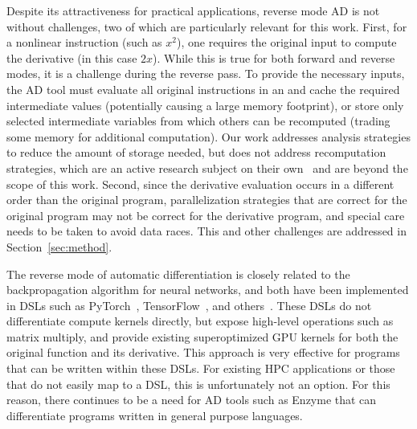 {Despite its attractiveness for practical applications, reverse mode AD is not without challenges, two of which are particularly relevant for this work. First, for a nonlinear instruction (such as $x^2$), one requires the original input to compute the derivative (in this case $2x$). While this is true for both forward and reverse modes, it is a challenge during the reverse pass. To provide the necessary inputs, the AD tool must evaluate all original instructions in an  and cache the required intermediate values (potentially causing a large memory footprint), or store only selected intermediate variables from which others can be recomputed (trading some memory for additional computation). Our work addresses  analysis strategies to reduce the amount of storage needed, but does not address recomputation strategies, which are an active research subject on their own~\cite{griewank2000algorithm,wang2009minimal,aupy2016optimal} and are beyond the scope of this work.
Second, since the derivative evaluation occurs in a different order than the original program, parallelization strategies that are correct for the original program may not be correct for the derivative program, and special care needs to be taken to avoid data races. This and other challenges are addressed in Section~\ref{sec:method}.

The reverse mode of automatic differentiation is closely related to the backpropagation algorithm for neural networks, and both have been implemented in DSLs
such as PyTorch~\cite{paszke2017automatic}, TensorFlow~\cite{abadi2016tensorflow}, and others~\cite{hu2020difftaichi,schoenholz2020jax,kochkov2021machine,de2018end}. These DSLs do not differentiate compute kernels directly, but expose high-level operations such as matrix multiply, and provide existing superoptimized GPU kernels for both the original function and its derivative. This approach is very effective for programs that can be written within these DSLs. For existing HPC applications or those that do not easily map to a DSL, this is unfortunately not an option. For this reason, there continues to be a need for AD tools such as Enzyme that can differentiate programs written in general purpose languages.}



